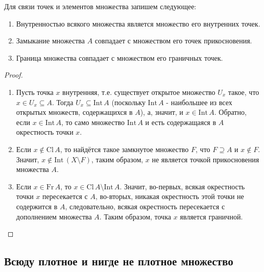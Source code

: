 \begin{theorem}

	Для связи точек и элементов множества запишем следующее:

	\begin{enumerate}
		\item Внутренностью всякого множества является множество его внутренних точек.
		
		\item Замыкание множества \(A\) совпадает с множеством его точек прикосновения.
		
		\item Граница множества совпадает с множеством его граничных точек.
	\end{enumerate}
	
\end{theorem}

\begin{proof}
	\begin{enumerate}
		\item Пусть точка \( x \) внутренняя, т.е. существует открытое множество \( U_x \) такое, что \( x \in U_x \subseteq A \). Тогда \( U_x \subseteq \text{Int} \, A \) (поскольку \( \text{Int} \, A \) - наибольшее из всех открытых множеств, содержащихся в \( A \)), а, значит, и \( x \in \text{Int} \, A \). Обратно, если \( x \in \text{Int} \, A \), то само множество \( \text{Int} \, A \) и есть содержащаяся в \( A \) окрестность точки \( x \).
		\item Если \( x \notin \text{Cl} \, A \), то найдётся такое замкнутое множество \( F \), что \( F \supseteq A \) и \( x \notin F \). Значит, \( x \notin \text{Int} \, (X \setminus F) \), таким образом, \( x \) не является точкой прикосновения множества \( A \).
		\item Если \( x \in \text{Fr} \, A \), то \( x \in \text{Cl} \, A \setminus \text{Int} \, A \). Значит, во-первых, всякая окрестность точки \( x \) пересекается с \( A \), во-вторых, никакая окрестность этой точки не содержится в \( A \), следовательно, всякая окрестность пересекается с дополнением множества \( A \). Таким образом, точка \( x \) является граничной.
	\end{enumerate}
\end{proof}

\subsection{Всюду плотное и нигде не плотное множество}

